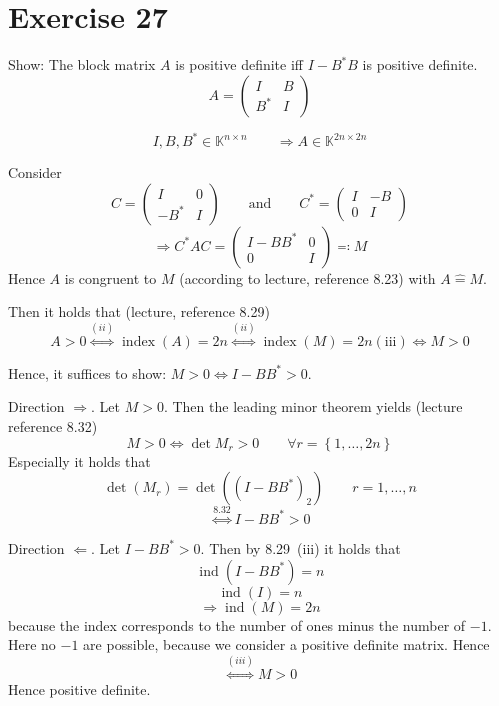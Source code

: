 \documentclass[a4paper]{article}
\theoremstyle{definition}
\newcommand\set[1]{\left\{#1\right\}}
\begin{document}
\section{Exercise 27}
\begin{ex}
  Show: The block matrix $A$ is positive definite iff $I - B^* B$ is positive definite.
  \[ A = \begin{pmatrix} I & B \\ B^* & I \end{pmatrix} \]
\end{ex}

\[ I, B, B^* \in \mathbb K^{n\times n} \qquad \Rightarrow A \in \mathbb K^{2n \times 2n} \]

Consider
\[
  C = \begin{pmatrix}
    I & 0 \\
    -B^* & I
  \end{pmatrix}
  \qquad
  \text{and}
  \qquad
  C^* = \begin{pmatrix}
    I & -B \\
    0 & I
  \end{pmatrix}
\] \[
  \Rightarrow C^* A C = \begin{pmatrix}
    I - B B^* & 0 \\
    0 & I
  \end{pmatrix}
  \eqqcolon M
\]
Hence $A$ is congruent to $M$ (according to lecture, reference 8.23) with $A \hat{=} M$.

Then it holds that (lecture, reference 8.29)
\[ A > 0 \overset{(ii)}{\Leftrightarrow} \operatorname{index}(A) = 2n \overset{(ii)}{\Leftrightarrow} \operatorname{index}(M) = 2n \operatorname{(iii)}{\Leftrightarrow} M > 0 \]

Hence, it suffices to show: $M > 0 \Leftrightarrow I - BB^* > 0$.

Direction $\Rightarrow$.
Let $M > 0$. Then the leading minor theorem yields (lecture reference 8.32)
\[ M > 0 \Leftrightarrow \det{M_r} > 0 \qquad \forall r = \set{1,\ldots,2n} \]
Especially it holds that
\[ \det(M_r) = \det((I - BB^*)_2) \qquad r = 1, \ldots, n \]
\[ \overset{8.32}{\Leftrightarrow} I - BB^* > 0 \]

Direction $\Leftarrow$.
Let $I - BB^* > 0$. Then by 8.29~(iii) it holds that
\[ \operatorname{ind}(I - BB^*) = n \]
\[ \operatorname{ind}(I) = n \]
\[ \Rightarrow \operatorname{ind}(M) = 2n \]
because the index corresponds to the number of ones minus the number of $-1$.
Here no $-1$ are possible, because we consider a positive definite matrix.
Hence
\[ \overset{(iii)}{\Leftrightarrow} M > 0\]
Hence positive definite.
\end{document}
